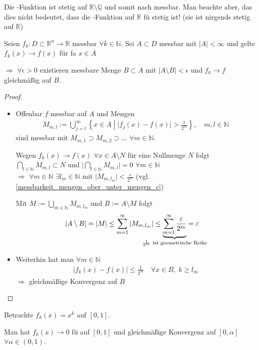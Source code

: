 \begin{underlinedenvironment}[Hinweis]
	Die -Funktion ist stetig auf $\mathbb{R}\setminus\mathbb{Q}$ und somit nach  messbar. Man beachte aber, das dies nicht bedeutet, dass die -Funktion auf $\mathbb{R}$ \gls{fü} stetig ist! (sie ist nirgends stetig auf $\mathbb{R}$)
\end{underlinedenvironment}

\begin{lemma}[Egorov]
	Seien $f_k:D\subset\mathbb{R}^n\to\mathbb{R}$ messbar $\forall k\in\mathbb{N}$. Sei $A\subset D$ messbar mit $\vert A \vert < \infty$ und gelte $f_k(x)\to f(x)$ für \gls{fa} $x\in A$
	
	$\Rightarrow$ $\forall \epsilon > 0$ existieren messbare Menge $B\subset A$ mit $\vert A \setminus B \vert < \epsilon$ und $f_k \to f$ gleichmäßig auf $B$.
\end{lemma}

\begin{proof}\hspace*{0pt}
	\begin{itemize}[topsep=\dimexpr -\baselineskip / 2 \relax]
	\item 
	Offenbar $f$ messbar auf $A$ und Mengen \begin{align*}
		M_{m,l} := \bigcup_{j=l}^\infty \left\{ x\in A \;\left| \; \vert f_j(x) - f(x)\vert > \frac{1}{2^m} \right. \right\},\quad m,l\in\mathbb{N}
	\end{align*}
	sind messbar mit $M_{m,1} \supset M_{m,2} \supset \dotsc$ $\forall m\in\mathbb{N}$.
	
	Wegen $f_k(x) \to f(x)$ $\forall x\in A\setminus N$ für eine Nullmenge $N$ folgt $\bigcap_{l\in\mathbb{N}} M_{m,l} \subset N$ und $\vert \bigcap_{l\in\mathbb{N}} M_{m,l} \vert = 0$ $\forall m\in\mathbb{N}$ \\
	$\Rightarrow$ $\forall m\in\mathbb{N}$ $\exists l_m \in\mathbb{N}$ mit $\vert M_{m,l_m} \vert < \frac{\epsilon}{2^m}$ (vgl.  \ref{messbarkeit_mengen_ober_unter_mengen_c})
	
	Mit $M:=\bigcup_{m\in\mathbb{N}} M_{m,l_m}$ und $B:= A\setminus M$ folgt \begin{align*}
		\vert A \setminus B \vert &= \vert M \vert \le \sum_{m=1}^\infty \vert M_{m,l_m} \vert \le \underbrace{\sum_{m=1}^\infty \frac{\epsilon}{2^m}}_{\mathclap{\frac{1}{2^m}\text{ ist geometrische Reihe}}} = \epsilon
	\end{align*}
	\item Weiterhin hat man $\forall m\in\mathbb{N}$ \begin{align*}
		\vert f_k(x) - f(x) \vert \le \frac{1}{2^m}\quad\forall x\in B,\;k \ge l_m
	\end{align*}
	$\Rightarrow$ gleichmäßige Konvergenz auf $B$
	\end{itemize}
\end{proof}

\begin{example}
	Betrachte $f_k(x) = x^k$ auf $[0,1]$.
	
	Man hat $f_k(x) \to 0$ \gls{fü} auf $[0,1]$ und gleichmäßige Konvergenz auf $[0,\alpha]$ $\forall \alpha\in (0,1)$.
\end{example}
